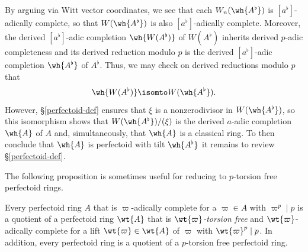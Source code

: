 By arguing via Witt vector coordinates, we see that each $W_n(\wh{A^\flat})$ is $[a^\flat]$-adically complete, so that $W(\wh{A^\flat})$ is also $[a^\flat]$-adically complete. Moreover, the derived $[a^\flat]$-adic completion $\wh{W(A^\flat)}$ of $W(A^\flat)$ inherits derived $p$-adic completeness and its derived reduction modulo $p$ is the derived $[a^\flat]$-adic completion $\wh{A^\flat}$ of $A^\flat$. Thus, we may check on derived reductions modulo $p$ that %
\[
\wh{W(A^\flat)} \isomto W(\wh{A^\flat}).
\]
However, \S\ref{perfectoid-def} ensures that $\xi$ is a nonzerodivisor in $W(\wh{A^\flat})$, so this isomorphism shows that $W(\wh{A^\flat})/(\xi)$ is the derived $a$-adic completion $\wh{A}$ of $A$ and, simultaneously, that $\wh{A}$ is a classical ring. To then conclude that $\wh{A}$ is perfectoid with tilt $\wh{A^\flat}$ it remains to review \S\ref{perfectoid-def}.
\epf









The following proposition is sometimes useful for reducing to $p$-torsion free perfectoid rings.


\bprop {}
Every perfectoid ring $A$ that is $\varpi$-adically complete for a $\varpi \in A$ with $\varpi^p \mid p$ is a quotient of a  perfectoid ring $\wt{A}$ that is \emph{$\wt{\varpi}$-torsion free} and $\wt{\varpi}$-adically complete for a lift $\wt{\varpi} \in \wt{A}$ of $\varpi$ with $\wt{\varpi}^p \mid p$. In addition, every perfectoid ring is a quotient of a $p$-torsion free perfectoid ring. %
\eprop

